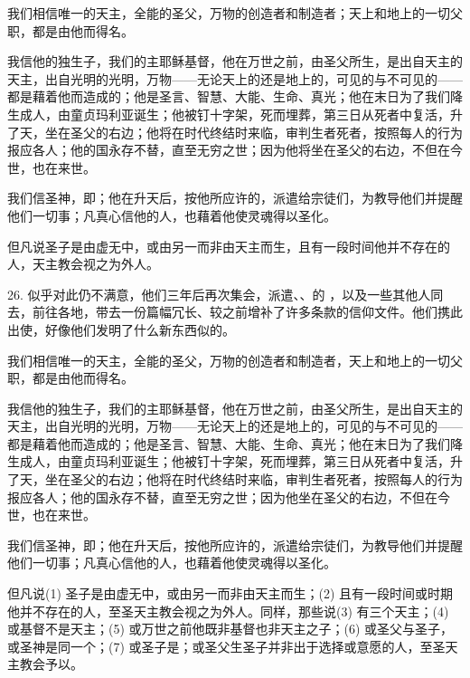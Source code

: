 我们相信唯一的天主，全能的圣父，万物的创造者和制造者；天上和地上的一切父职，都是由他而得名。\par

我信他的独生子，我们的主耶稣基督，他在万世之前，由圣父所生，是出自天主的天主，出自光明的光明，万物——无论天上的还是地上的，可见的与不可见的——都是藉着他而造成的；他是圣言、智慧、大能、生命、真光；他在末日为了我们降生成人，由童贞玛利亚诞生；他被钉十字架，死而埋葬，第三日从死者中复活，升了天，坐在圣父的右边；他将在时代终结时来临，审判生者死者，按照每人的行为报应各人；他的国永存不替，直至无穷之世；因为他将坐在圣父的右边，不但在今世，也在来世。\par

我们信圣神，即；他在升天后，按他所应许的，派遣给宗徒们，为教导他们并提醒他们一切事；凡真心信他的人，也藉着他使灵魂得以圣化。\par

但凡说圣子是由虚无中，或由另一而非由天主而生，且有一段时间他并不存在的人，天主教会视之为外人。\par

26. 似乎对此仍不满意，他们三年后再次集会，派遣、、的 ，以及一些其他人同去，前往各地，带去一份篇幅冗长、较之前增补了许多条款的信仰文件。他们携此出使，好像他们发明了什么新东西似的。\par

我们相信唯一的天主，全能的圣父，万物的创造者和制造者，天上和地上的一切父职，都是由他而得名。\par

我信他的独生子，我们的主耶稣基督，他在万世之前，由圣父所生，是出自天主的天主，出自光明的光明，万物——无论天上的还是地上的，可见的与不可见的——都是藉着他而造成的；他是圣言、智慧、大能、生命、真光；他在末日为了我们降生成人，由童贞玛利亚诞生；他被钉十字架，死而埋葬，第三日从死者中复活，升了天，坐在圣父的右边；他将在时代终结时来临，审判生者死者，按照每人的行为报应各人；他的国永存不替，直至无穷之世；因为他坐在圣父的右边，不但在今世，也在来世。\par

我们信圣神，即；他在升天后，按他所应许的，派遣给宗徒们，为教导他们并提醒他们一切事；凡真心信他的人，也藉着他使灵魂得以圣化。\par

但凡说(1) 圣子是由虚无中，或由另一而非由天主而生；(2) 且有一段时间或时期他并不存在的人，至圣天主教会视之为外人。同样，那些说(3) 有三个天主；(4) 或基督不是天主；(5) 或万世之前他既非基督也非天主之子；(6) 或圣父与圣子，或圣神是同一个；(7) 或圣子是；或圣父生圣子并非出于选择或意愿的人，至圣天主教会予以。\par

